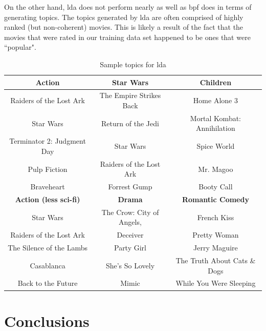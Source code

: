 \documentclass{article} %
\begin{document}
On the other hand, \gls{lda} does not perform nearly as well as \gls{bpf} does in terms of generating topics. The topics generated by \gls{lda} are often comprised of highly ranked (but non-coherent) movies. This is likely a result of the fact that the movies that were rated in our training data set happened to be ones that were ``popular".
\begin{table}[h]
    \begin{tabularx}{\textwidth}{	ccc} \toprule
    \textbf{Action}                     & \textbf{Star Wars}               & \textbf{Children}                    \\ \midrule
    Raiders of the Lost Ark    & The Empire Strikes Back & Home Alone 3                \\
    Star Wars                  & Return of the Jedi      & Mortal Kombat: Annihilation \\
    Terminator 2: Judgment Day & Star Wars               & Spice World                 \\
    Pulp Fiction               & Raiders of the Lost Ark & Mr. Magoo                   \\
    Braveheart                 & Forrest Gump            & Booty Call                   \vspace{3mm} \\  \toprule
    \textbf{Action (less sci-fi)}     & \textbf{Drama}                     & \textbf{Romantic Comedy}              \\ \midrule
    Star Wars                & The Crow: City of Angels, & French Kiss                  \\
    Raiders of the Lost Ark  & Deceiver                  & Pretty Woman                 \\
    The Silence of the Lambs & Party Girl                & Jerry Maguire                \\
    Casablanca               & She's So Lovely           & The Truth About Cats \& Dogs \\
    Back to the Future       & Mimic                     & While You Were Sleeping      \\
    \end{tabularx}
    \caption {Sample topics for \gls{lda}}
\end{table}

\section{Conclusions}
\end{document}

